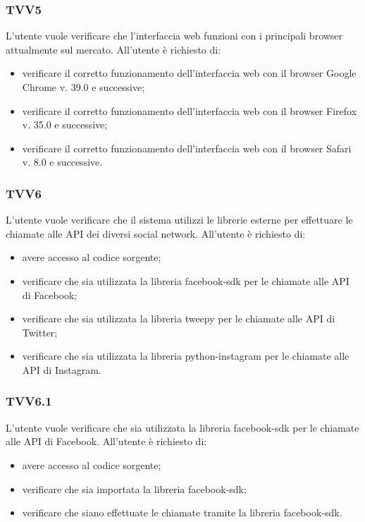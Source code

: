 		\subsubsection{TVV5}
			L'utente vuole verificare che l'interfaccia web funzioni con i principali browser attualmente sul mercato. All'utente è richiesto di:
			\begin{itemize}
				\item verificare il corretto funzionamento dell'interfaccia web con il browser Google Chrome v. 39.0 e successive;
				\item verificare il corretto funzionamento dell'interfaccia web con il browser Firefox v. 35.0 e successive;
				\item verificare il corretto funzionamento dell'interfaccia web con il browser Safari v. 8.0 e successive.
			\end{itemize}
			
			
		\subsubsection{TVV6}
			L'utente vuole verificare che il sistema utilizzi le librerie esterne per effettuare le chiamate alle API dei diversi social network. All'utente è richiesto di:
			\begin{itemize}
				\item avere accesso al codice sorgente;
				\item verificare che sia utilizzata la libreria facebook-sdk per le chiamate alle API di Facebook;
				\item verificare che sia utilizzata la libreria tweepy per le chiamate alle API di Twitter;
				\item verificare che sia utilizzata la libreria python-instagram per le chiamate alle API di Instagram.
			\end{itemize}
			
		\subsubsection{TVV6.1}
			L'utente vuole verificare che sia utilizzata la libreria facebook-sdk per le chiamate alle API di Facebook. All'utente è richiesto di:
			\begin{itemize}
				\item avere accesso al codice sorgente;
				\item verificare che sia importata la libreria facebook-sdk;
				\item verificare che siano effettuate le chiamate tramite la libreria facebook-sdk.
			\end{itemize}
			
